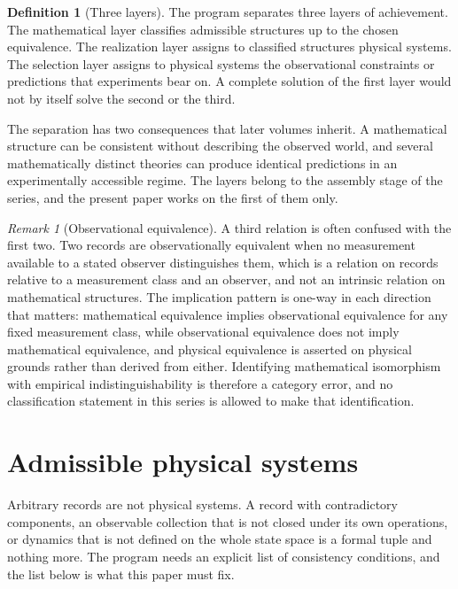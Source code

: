 \documentclass[11pt,letterpaper]{article}
\theoremstyle{definition}
\newtheorem{definition}[theorem]{Definition}
\theoremstyle{remark}
\newtheorem{remark}[theorem]{Remark}
\begin{document}
\begin{definition}[Three layers]
\label{def:three-layers}
The program separates three layers of achievement. The mathematical layer classifies admissible structures up to the chosen equivalence. The realization layer assigns to classified structures physical systems. The selection layer assigns to physical systems the observational constraints or predictions that experiments bear on. A complete solution of the first layer would not by itself solve the second or the third.
\end{definition}

The separation has two consequences that later volumes inherit. A mathematical structure can be consistent without describing the observed world, and several mathematically distinct theories can produce identical predictions in an experimentally accessible regime. The layers belong to the assembly stage of the series, and the present paper works on the first of them only.

\begin{remark}[Observational equivalence]
\label{rem:observational}
A third relation is often confused with the first two. Two records are observationally equivalent when no measurement available to a stated observer distinguishes them, which is a relation on records relative to a measurement class and an observer, and not an intrinsic relation on mathematical structures. The implication pattern is one-way in each direction that matters: mathematical equivalence implies observational equivalence for any fixed measurement class, while observational equivalence does not imply mathematical equivalence, and physical equivalence is asserted on physical grounds rather than derived from either. Identifying mathematical isomorphism with empirical indistinguishability is therefore a category error, and no classification statement in this series is allowed to make that identification.
\end{remark}

\section{Admissible physical systems}
\label{sec:admissibility}

Arbitrary records are not physical systems. A record with contradictory components, an observable collection that is not closed under its own operations, or dynamics that is not defined on the whole state space is a formal tuple and nothing more. The program needs an explicit list of consistency conditions, and the list below is what this paper must fix.
\end{document}
